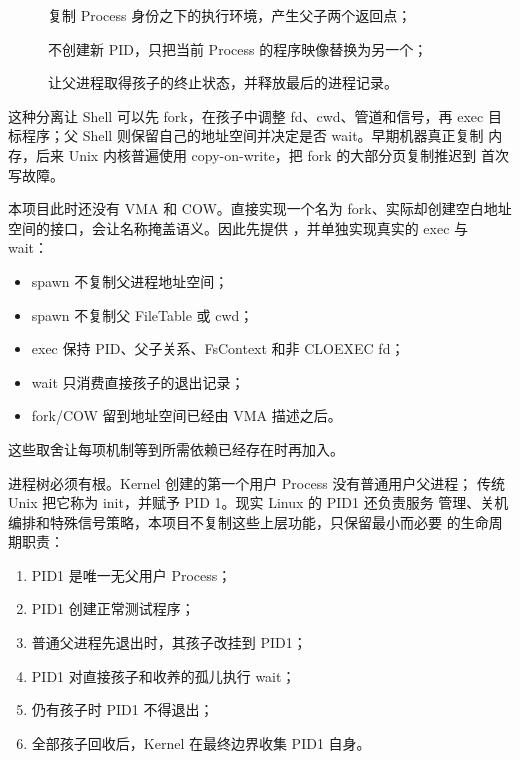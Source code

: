 \begin{description}
  \item[] 复制 Process 身份之下的执行环境，产生父子两个返回点；
  \item[] 不创建新 PID，只把当前 Process 的程序映像替换为另一个；
  \item[] 让父进程取得孩子的终止状态，并释放最后的进程记录。
\end{description}

这种分离让 Shell 可以先 fork，在孩子中调整 fd、cwd、管道和信号，再 exec
目标程序；父 Shell 则保留自己的地址空间并决定是否 wait。早期机器真正复制
内存，后来 Unix 内核普遍使用 copy-on-write，把 fork 的大部分页复制推迟到
首次写故障。

本项目此时还没有 VMA 和 COW。直接实现一个名为 fork、实际却创建空白地址
空间的接口，会让名称掩盖语义。因此先提供 ，并单独实现真实的 exec 与 wait：

\begin{itemize}
  \item spawn 不复制父进程地址空间；
  \item spawn 不复制父 FileTable 或 cwd；
  \item exec 保持 PID、父子关系、FsContext 和非 CLOEXEC fd；
  \item wait 只消费直接孩子的退出记录；
  \item fork/COW 留到地址空间已经由 VMA 描述之后。
\end{itemize}

这些取舍让每项机制等到所需依赖已经存在时再加入。

进程树必须有根。Kernel 创建的第一个用户 Process 没有普通用户父进程；
传统 Unix 把它称为 init，并赋予 PID 1。现实 Linux 的 PID1 还负责服务
管理、关机编排和特殊信号策略，本项目不复制这些上层功能，只保留最小而必要
的生命周期职责：

\begin{enumerate}
  \item PID1 是唯一无父用户 Process；
  \item PID1 创建正常测试程序；
  \item 普通父进程先退出时，其孩子改挂到 PID1；
  \item PID1 对直接孩子和收养的孤儿执行 wait；
  \item 仍有孩子时 PID1 不得退出；
  \item 全部孩子回收后，Kernel 在最终边界收集 PID1 自身。
\end{enumerate}

